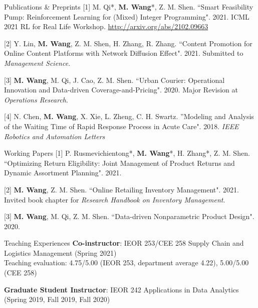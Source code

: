 \documentclass{resume} %
\makeatletter
\def\blfootnote{\xdef\@thefnmark{}\@footnotetext}
\makeatother
\begin{document}

\begin{rSection}{Publications \& Preprints} 
[1] M. Qi*\blfootnote{* denotes alphabetical ordering.}, \textbf{M. Wang}*, Z. M. Shen. ``Smart Feasibility Pump: Reinforcement Learning for (Mixed) Integer Programming". 2021. ICML 2021 RL for Real Life Workshop. \url{http://arxiv.org/abs/2102.09663}

[2] Y. Lin, \textbf{M. Wang}, Z. M. Shen, H. Zhang, R. Zhang. ``Content Promotion for Online Content Platforms with Network Diffusion Effect". 2021. Submitted to \textit{Management Science}.

[3] \textbf{M. Wang}, M. Qi, J. Cao, Z. M. Shen. ``Urban Courier: Operational Innovation and Data-driven Coverage-and-Pricing". 2020. Major Revision at \textit{Operations Research}.

[4] N. Chen, \textbf{M. Wang}, X. Xie, L. Zheng, C. H. Swartz. ''Modeling and Analysis of the Waiting Time of Rapid Response Process in Acute Care". 2018. \textit{IEEE Robotics and Automation Letters}
\end{rSection}

\begin{rSection}{Working Papers}
[1] P. Rusmevichientong*,  \textbf{M. Wang}*, H. Zhang*,  Z. M. Shen. ``Optimizing Return Eligibility:
Joint Management of Product Returns and Dynamic Assortment Planning". 2021. 

[2] \textbf{M. Wang}, Z. M. Shen. ``Online Retailing Inventory Management". 2021. Invited book chapter for \textit{Research Handbook on Inventory Management}. 

[3] \textbf{M. Wang}, M. Qi, Z. M. Shen. ``Data-driven Nonparametric Product Design". 2020. 
\end{rSection}

\newpage
\begin{rSection}{Teaching Experiences}
\vspace{1mm}\textbf{Co-instructor}: IEOR 253/CEE 258 Supply Chain and Logistics Management (Spring 2021) \\Teaching evaluation: 4.75/5.00 (IEOR 253, department average 4.22), 5.00/5.00 (CEE 258)

\vspace{1mm}\textbf{Graduate Student Instructor}:
IEOR 242 Applications in Data Analytics (Spring 2019, Fall 2019, Fall 2020)





\end{rSection}
\end{document}
